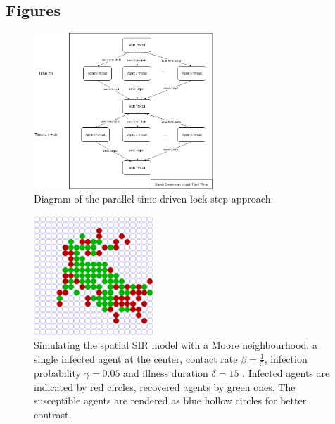 \documentclass{bmcart}
\begin{document}
\begin{backmatter}



\section*{Figures}
\begin{figure}[h!]
	\includegraphics[width=0.6\textwidth, angle=0]{./stm_abs.png}
	\caption{Diagram of the parallel time-driven lock-step approach.}
	\label{fig:stm_abs_structure}
\end{figure}

\begin{figure}[h!]
	\includegraphics[width=0.4\textwidth, angle=0]{./sir_vis.png}
	\caption{Simulating the spatial SIR model with a Moore neighbourhood, a single infected agent at the center, contact rate $\beta = \frac{1}{5}$, infection probability $\gamma = 0.05$ and illness duration $\delta = 15$ . Infected agents are indicated by red circles, recovered agents by green ones. The susceptible agents are rendered as blue hollow circles for better contrast.}
	\label{fig:vis_sir}
\end{figure}


\end{backmatter}
\end{document}
